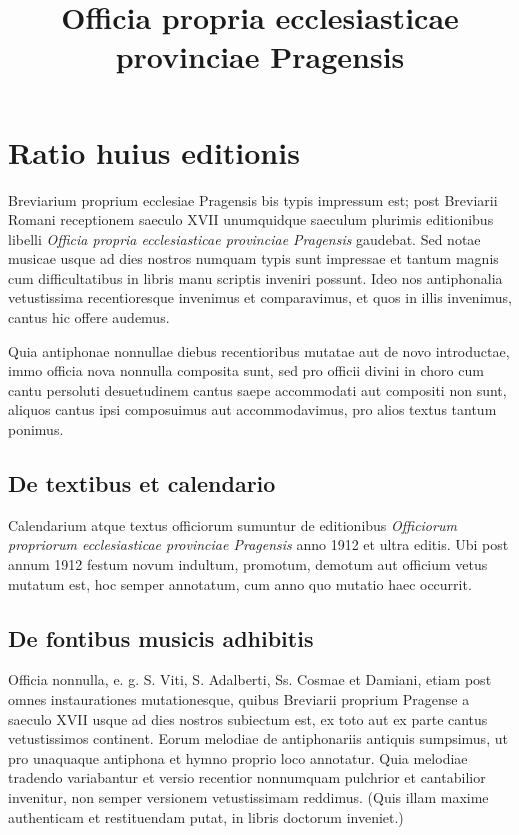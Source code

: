 \documentclass[12pt, a5paper, twoside]{book}
\title{Officia propria ecclesiasticae provinciae Pragensis}
\begin{document}
\pagestyle{empty}

\setlength{\parindent}{0.5cm}

\maketitle

\cleardoublepage

\pagestyle{plain}

\chapter*{Ratio huius editionis}

Breviarium proprium ecclesiae Pragensis bis
typis impressum est; post Breviarii Romani receptionem
saeculo XVII unumquidque saeculum plurimis editionibus
libelli \emph{Officia propria ecclesiasticae provinciae Pragensis} gaudebat.
Sed notae musicae usque ad dies nostros numquam typis sunt impressae
et tantum magnis cum difficultatibus in libris manu scriptis
inveniri possunt. Ideo nos antiphonalia vetustissima recentioresque
invenimus et comparavimus, et quos in illis invenimus,
cantus hic offere audemus.

Quia antiphonae nonnullae diebus recentioribus mutatae aut de novo
introductae, immo officia nova nonnulla composita sunt,
sed pro officii divini in choro cum cantu persoluti desuetudinem
cantus saepe accommodati aut compositi non sunt,
aliquos cantus ipsi composuimus aut accommodavimus, pro alios
textus tantum ponimus.

\section*{De textibus et calendario}
Calendarium atque textus officiorum sumuntur de editionibus
\emph{Officiorum propriorum ecclesiasticae provinciae Pragensis}
anno 1912 et ultra editis.
Ubi post annum 1912 festum novum indultum, promotum, demotum
aut officium vetus mutatum est, hoc semper annotatum,
cum anno quo mutatio haec occurrit.

\section*{De fontibus musicis adhibitis}
Officia nonnulla, e. g. S. Viti, S. Adalberti, Ss. Cosmae et Damiani,
etiam post omnes instaurationes mutationesque, quibus
Breviarii proprium Pragense a saeculo XVII usque ad dies nostros
subiectum est, ex toto aut ex parte cantus vetustissimos
continent.
Eorum melodiae de antiphonariis antiquis sumpsimus,
ut pro unaquaque antiphona et hymno proprio loco annotatur.
Quia melodiae tradendo variabantur et versio recentior nonnumquam
pulchrior et cantabilior invenitur, non semper versionem
vetustissimam reddimus.
(Quis illam maxime authenticam et restituendam putat,
in libris doctorum inveniet.)
\end{document}
